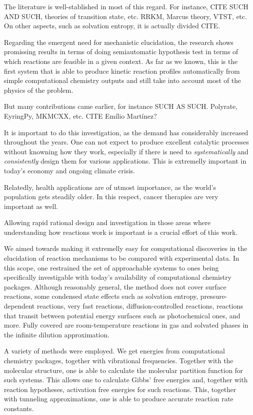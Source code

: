 The literature is well-stablished in most of this regard.
For instance, CITE SUCH AND SUCH, theories of transition state, etc.
RRKM, Marcus theory, VTST, etc.
On other aspects, such as solvation entropy, it is actually divided CITE.\@

Regarding the emergent need for mechanistic elucidation, the research shows promissing
results in terms of doing semiautomatic hypothesis test in terms of which reactions are feasible
in a given context.
As far as we known, this is the first system that is able to produce kinetic reaction profiles
automatically from simple computational chemistry outputs and still take into account most of the physics of the problem.

But many contributions came earlier, for instance SUCH AS SUCH.\@
Polyrate, EyringPy, MKMCXX, etc.
CITE Emílio Martínez?

It is important to do this investigation, as the demand has considerably increased throughout the years.
One can not expect to produce excellent catalytic processes without knowning how they work,
especially if there is need to \emph{systematically} and \emph{consistently} design them for various applications.
This is extremelly important in today's economy and ongoing climate crisis.

Relatedly, health applications are of utmost importance, as the world's population gets steadily older.
In this respect, cancer therapies are very important as well.

Allowing rapid rational design and investigation in those areas where understanding how reactions work is important
is a crucial effort of this work.

We aimed towards making it extremelly easy for computational discoveries in the elucidation of reaction mechanisms
to be compared with experimental data.
In this scope, one restrained the set of approachable systems to ones
being specifically investigable with today's availability of computational chemistry packages.
Although reasonably general, the method does not cover surface reactions,
some condensed state effects such as solvation entropy,
pressure-dependent reactions,
very fast reactions,
diffusion-controlled reactions,
reactions that transit between potential energy surfaces such as photochemical ones, and more.
Fully covered are room-temperature reactions in gas and solvated phases in the infinite dilution approximation.

A variety of methods were employed.
We get energies from computational chemistry packages,
together with vibrational frequencies.
Together with the molecular structure,
one is able to calculate the molecular partition function for such systems.
This allows one to calculate Gibbs' free energies and, together with reaction hypotheses,
activation free energies for such reactions.
This, together with tunneling approximations, one is able to produce accurate reaction rate constants.

